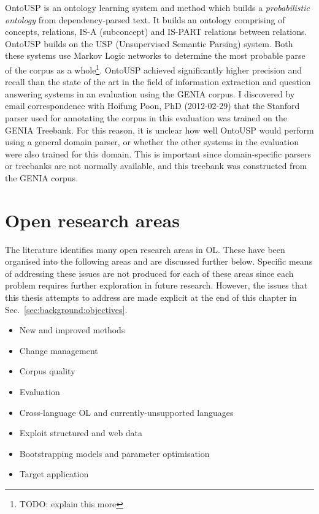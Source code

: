 \documentclass[a4paper]{report}
\newcommand{\todo}[1]{\footnote{{\color{red} TODO: #1}}}
\begin{document}
OntoUSP is an ontology learning system and method which builds a \emph{probabilistic ontology} from dependency-parsed text\cite{Poon2010OntoUSP}.
It builds an ontology comprising of concepts, relations, IS-A (subconcept) and IS-PART relations between relations.
OntoUSP builds on the USP (Unsupervised Semantic Parsing) system\cite{Poon09USP}.
Both these systems use Markov Logic networks to determine the most probable parse of the corpus as a whole\todo{explain this more}.
OntoUSP achieved significantly higher precision and recall than the state of the art in the field of information extraction and question answering systems in an evaluation using the GENIA\citep{KimEtAl03GeniaCorpus} corpus\cite{Poon2010OntoUSP}.
I discovered by email correspondence with Hoifung Poon, PhD (2012-02-29) that the Stanford parser\cite{Klein03PCFGParser} used for annotating the corpus in this evaluation was trained on the GENIA Treebank\cite{Tatseisi05GENIATB}.
For this reason, it is unclear how well OntoUSP would perform using a general domain parser, or whether the other systems in the evaluation were also trained for this domain.
This is important since domain-specific parsers or treebanks are not normally available, and this treebank was constructed from the GENIA corpus.

\section{Open research areas}
\label{sec:background:open-areas}

The literature identifies many open research areas in OL.
These have been organised into the following areas and are discussed further below. Specific means of addressing these issues are not produced for each of these areas since each problem requires further exploration in future research.
However, the issues that this thesis attempts to address are made explicit at the end of this chapter in Sec.~\ref{sec:background:objectives}.

\begin{itemize}
\item New and improved methods
\item Change management
\item Corpus quality
\item Evaluation
\item Cross-language OL and currently-unsupported languages
\item Exploit structured and web data
\item Bootstrapping models and parameter optimisation
\item Target application
\end{itemize}
\end{document}
